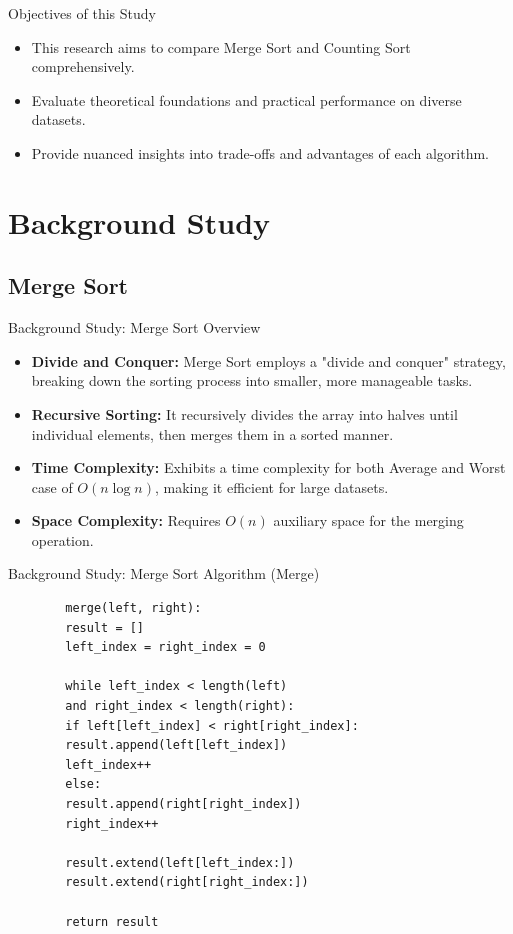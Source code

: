 \documentclass{beamer}
\begin{document}
	\begin{frame}{Objectives of this Study}
		\begin{itemize}
			\item This research aims to compare Merge Sort and Counting Sort comprehensively.
			
			\item Evaluate theoretical foundations and practical performance on diverse datasets.
			
			\item Provide nuanced insights into trade-offs and advantages of each algorithm.\cite{googlescholar}
		\end{itemize}
	\end{frame}
\section{Background Study}

\subsection{Merge Sort}

\begin{frame}{Background Study: Merge Sort Overview}
	\begin{itemize}
		\item \textbf{Divide and Conquer:} Merge Sort employs a "divide and conquer" strategy, breaking down the sorting process into smaller, more manageable tasks.
		\item \textbf{Recursive Sorting:} It recursively divides the array into halves until individual elements, then merges them in a sorted manner.
		\item \textbf{Time Complexity:} Exhibits a time complexity for both Average and Worst case of $O(n \log n)$, making it efficient for large datasets.
		\item \textbf{Space Complexity:} Requires $O(n)$ auxiliary space for the merging operation.\cite{geeksforgeeks-merge-sort}
	\end{itemize}
\end{frame}

\begin{frame}[fragile]{Background Study: Merge Sort Algorithm (Merge)}
	\begin{verbatim}
		merge(left, right):
		result = []
		left_index = right_index = 0
		
		while left_index < length(left) 
		and right_index < length(right):
		if left[left_index] < right[right_index]:
		result.append(left[left_index])
		left_index++
		else:
		result.append(right[right_index])
		right_index++
		
		result.extend(left[left_index:])
		result.extend(right[right_index:])
		
		return result
	\end{verbatim}
\end{frame}
\end{document}
